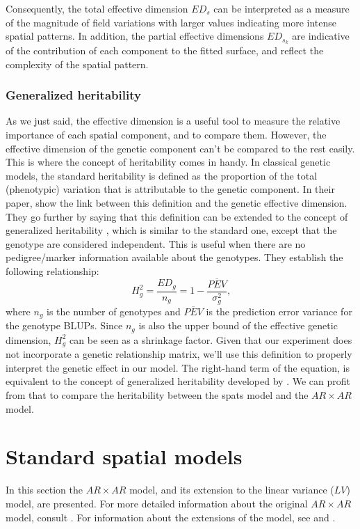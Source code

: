 Consequently, the total effective dimension $ED_{s}$ can be interpreted as a measure of the magnitude of field variations with larger values indicating more intense spatial patterns. In addition, the partial effective dimensions $ED_{s_{k}}$ are indicative of the contribution of each component to the fitted surface, and reflect the complexity of the spatial pattern.

\subsubsection{Generalized heritability}
As we just said, the effective dimension is a useful tool to measure the relative importance of each spatial component, and to compare them. However, the effective dimension of the genetic component can't be compared to the rest easily. This is where the concept of heritability comes in handy. In classical genetic models, the standard heritability is defined as the proportion of the total (phenotypic) variation that is attributable to the genetic component. In their paper, \textcite{rodriguez-alvarez_correcting_2018} show the link between this definition and the genetic effective dimension. They go further by saying that this definition can be extended to the concept of generalized heritability \parencite{oakey_joint_2006}, which is similar to the standard one, except that the genotype are considered independent. This is useful when there are no pedigree/marker information available about the genotypes. They establish the following relationship:
\begin{equation}
H_{g}^2 = \dfrac{ED_{g}}{n_{g}} = 1 - \dfrac{\overline{PEV}}{\sigma^2_{g}}
\text{,}
\end{equation}
where $n_{g}$ is the number of genotypes and $\overline{PEV}$ is the prediction error variance for the genotype BLUPs. Since $n_{g}$ is also the upper bound of the effective genetic dimension, $H^2_{g}$ can be seen as a shrinkage factor. Given that our experiment does not incorporate a genetic relationship matrix, we'll use this definition to properly interpret the genetic effect in our model. The right-hand term of the equation, is equivalent to the concept of generalized heritability developed by \textcite{welham2010comparison}. We can profit from that to compare the heritability between the spats model and the $AR \times AR$ model.

\section{Standard spatial models}
\label{sec:arxar_model}
In this section the $AR \times AR$ model, and its extension to the linear variance ($LV$) model, are presented. For more detailed information about the original $AR \times AR$ model, consult \textcite{gilmour_accounting_1997}. For information about the extensions of the model, see \textcite{piepho_linear_2010} and \textcite{williams_neighbour_1986}.\\

